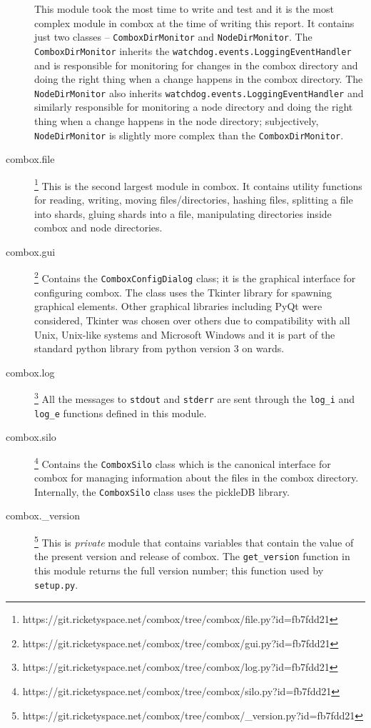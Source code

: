 \begin{description}
  This module took the most time to write and test and it is the most
  complex module in combox at the time of writing this report. It
  contains just two classes -- \verb+ComboxDirMonitor+ and
  \verb+NodeDirMonitor+. The \verb+ComboxDirMonitor+ inherits the
  \verb+watchdog.events.LoggingEventHandler+ and is responsible for
  monitoring for changes in the combox directory and doing the right
  thing when a change happens in the combox directory. The
  \verb+NodeDirMonitor+ also inherits
  \verb+watchdog.events.LoggingEventHandler+ and similarly responsible
  for monitoring a node directory and doing the right thing when a
  change happens in the node directory; subjectively,
  \verb+NodeDirMonitor+ is slightly more complex than the
  \verb+ComboxDirMonitor+.
\item[combox.file]\footnote{https://git.ricketyspace.net/combox/tree/combox/file.py?id=fb7fdd21} This is the second largest module in combox. It
  contains utility functions for reading, writing, moving
  files/directories, hashing files, splitting a file into shards, gluing
  shards into a file, manipulating directories inside combox and node
  directories.
\item[combox.gui]\footnote{https://git.ricketyspace.net/combox/tree/combox/gui.py?id=fb7fdd21}
  Contains the \verb+ComboxConfigDialog+ class; it is the graphical
  interface for configuring combox. The class uses the Tkinter
  library\cite{pylib:tkinter} for spawning graphical elements. Other
  graphical libraries including PyQt\cite{pylib:qt} were considered,
  Tkinter was chosen over others due to compatibility with all Unix,
  Unix-like systems and Microsoft Windows and it is part of the
  standard python library from python version 3 on wards.
\item[combox.log]\footnote{https://git.ricketyspace.net/combox/tree/combox/log.py?id=fb7fdd21}
  All the messages to \verb+stdout+ and \verb+stderr+ are sent through
  the \verb+log_i+ and \verb+log_e+ functions defined in this module.
\item[combox.silo]\footnote{https://git.ricketyspace.net/combox/tree/combox/silo.py?id=fb7fdd21} Contains the \verb+ComboxSilo+ class which is the
  canonical interface for combox for managing information about the
  files in the combox directory. Internally, the \verb+ComboxSilo+
  class uses the pickleDB library\cite{pylib:pickledb}.
\item[combox.\_version]\footnote{https://git.ricketyspace.net/combox/tree/combox/\_version.py?id=fb7fdd21} This is \emph{private} module that contains
  variables that contain the value of the present version and release
  of combox. The \verb+get_version+ function in this module returns
  the full version number; this function used by \verb+setup.py+.
\end{description}

